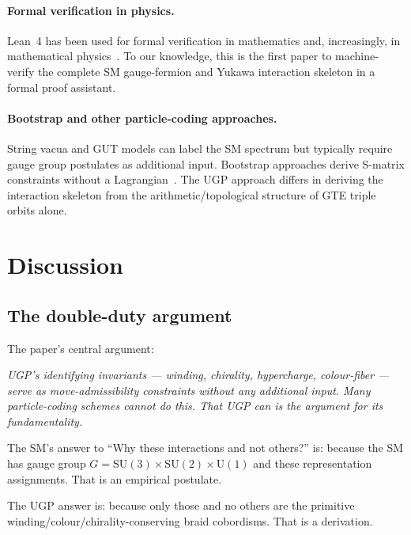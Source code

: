 \documentclass[12pt]{article}
\theoremstyle{remark}
\begin{document}
\paragraph{Formal verification in physics.}
Lean~4 has been used for formal verification in mathematics and, increasingly,
in mathematical physics~\cite{mathlib4}.  To our knowledge, this is the first
paper to machine-verify the complete SM gauge-fermion and Yukawa interaction
skeleton in a formal proof assistant.

\paragraph{Bootstrap and other particle-coding approaches.}
String vacua and GUT models can label the SM spectrum but typically require
gauge group postulates as additional input.  Bootstrap approaches derive
S-matrix constraints without a Lagrangian~\cite{veneziano68}.  The UGP
approach differs in deriving the interaction skeleton from the arithmetic/topological
structure of GTE triple orbits alone.

\section{Discussion}
\label{sec:discussion}

\subsection{The double-duty argument}

The paper's central argument:
\begin{tcolorbox}[colback=gray!8,colframe=black!60]
\emph{UGP's identifying invariants --- winding, chirality, hypercharge,
colour-fiber --- serve as move-admissibility constraints without any additional
input.  Many particle-coding schemes cannot do this.  That UGP can is the
argument for its fundamentality.}
\end{tcolorbox}

The SM's answer to ``Why these interactions and not others?'' is: because
the SM has gauge group $G = \mathrm{SU}(3) \times \mathrm{SU}(2) \times
\mathrm{U}(1)$ and these representation assignments.  That is an empirical
postulate.

The UGP answer is: because only those and no others are the primitive
winding/colour/chirality-conserving braid cobordisms.  That is a derivation.
\end{document}
